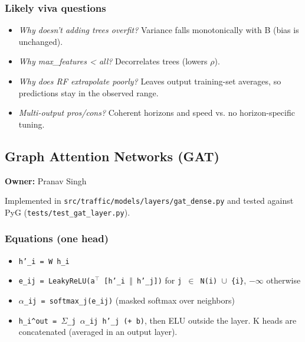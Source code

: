 \documentclass[10pt,a4paper]{article}
\begin{document}
\subsubsection*{Likely viva questions}
\begin{itemize}[nosep,leftmargin=*]
\item \emph{Why doesn't adding trees overfit?} Variance falls monotonically with B (bias is unchanged).
\item \emph{Why max\_\allowbreak{}features < all?} Decorrelates trees (lowers \ensuremath{\rho}).
\item \emph{Why does RF extrapolate poorly?} Leaves output training-set averages, so predictions stay in the observed range.
\item \emph{Multi-output pros/\allowbreak{}cons?} Coherent horizons and speed vs. no horizon-specific tuning.
\end{itemize}

\subsection*{Graph Attention Networks (GAT)}
\textbf{Owner:} Pranav Singh

Implemented in \texttt{src/\allowbreak{}traffic/\allowbreak{}models/\allowbreak{}layers/\allowbreak{}gat\_\allowbreak{}dense.py} and tested against PyG (\texttt{tests/\allowbreak{}test\_\allowbreak{}gat\_\allowbreak{}layer.py}).

\subsubsection*{Equations (one head)}
\begin{itemize}[nosep,leftmargin=*]
\item \texttt{h'\_\allowbreak{}i = W h\_\allowbreak{}i}
\item \texttt{e\_\allowbreak{}ij = LeakyReLU(a\ensuremath{^{\top}} [h'\_\allowbreak{}i \ensuremath{\Vert} h'\_\allowbreak{}j])} for \texttt{j \ensuremath{\in} N(i) \ensuremath{\cup} \{i\}}, \texttt{\ensuremath{-}\ensuremath{\infty}} otherwise
\item \texttt{\ensuremath{\alpha}\_\allowbreak{}ij = softmax\_\allowbreak{}j(e\_\allowbreak{}ij)}  (masked softmax over neighbors)
\item \texttt{h\_\allowbreak{}i\^{}out = \ensuremath{\Sigma}\_\allowbreak{}j \ensuremath{\alpha}\_\allowbreak{}ij h'\_\allowbreak{}j (+ b)}, then ELU outside the layer. K heads are concatenated (averaged in an output layer).
\end{itemize}
\end{document}

